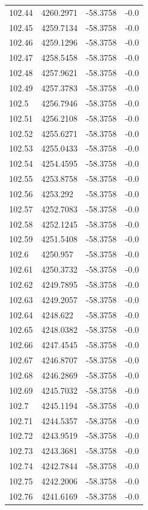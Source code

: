 \begin{table}[H]
\begin{tabular}{llll}
102.44 & 4260.2971 & -58.3758 & -0.0 \\
102.45 & 4259.7134 & -58.3758 & -0.0 \\
102.46 & 4259.1296 & -58.3758 & -0.0 \\
102.47 & 4258.5458 & -58.3758 & -0.0 \\
102.48 & 4257.9621 & -58.3758 & -0.0 \\
102.49 & 4257.3783 & -58.3758 & -0.0 \\
102.5 & 4256.7946 & -58.3758 & -0.0 \\
102.51 & 4256.2108 & -58.3758 & -0.0 \\
102.52 & 4255.6271 & -58.3758 & -0.0 \\
102.53 & 4255.0433 & -58.3758 & -0.0 \\
102.54 & 4254.4595 & -58.3758 & -0.0 \\
102.55 & 4253.8758 & -58.3758 & -0.0 \\
102.56 & 4253.292 & -58.3758 & -0.0 \\
102.57 & 4252.7083 & -58.3758 & -0.0 \\
102.58 & 4252.1245 & -58.3758 & -0.0 \\
102.59 & 4251.5408 & -58.3758 & -0.0 \\
102.6 & 4250.957 & -58.3758 & -0.0 \\
102.61 & 4250.3732 & -58.3758 & -0.0 \\
102.62 & 4249.7895 & -58.3758 & -0.0 \\
102.63 & 4249.2057 & -58.3758 & -0.0 \\
102.64 & 4248.622 & -58.3758 & -0.0 \\
102.65 & 4248.0382 & -58.3758 & -0.0 \\
102.66 & 4247.4545 & -58.3758 & -0.0 \\
102.67 & 4246.8707 & -58.3758 & -0.0 \\
102.68 & 4246.2869 & -58.3758 & -0.0 \\
102.69 & 4245.7032 & -58.3758 & -0.0 \\
102.7 & 4245.1194 & -58.3758 & -0.0 \\
102.71 & 4244.5357 & -58.3758 & -0.0 \\
102.72 & 4243.9519 & -58.3758 & -0.0 \\
102.73 & 4243.3681 & -58.3758 & -0.0 \\
102.74 & 4242.7844 & -58.3758 & -0.0 \\
102.75 & 4242.2006 & -58.3758 & -0.0 \\
102.76 & 4241.6169 & -58.3758 & -0.0 \\

\end{tabular}
\end{table}
